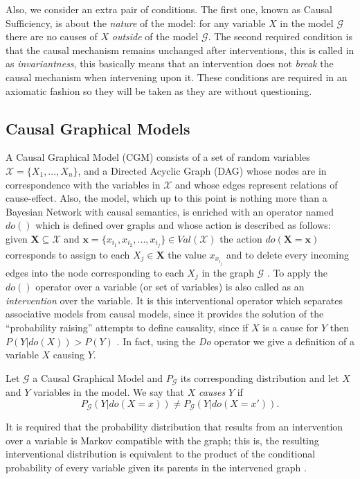 \documentclass{svjour3}                     %
\begin{document}
Also, we consider an extra pair of conditions. The first one, known as Causal Sufficiency, is about the \textit{nature} of the model: for any variable $X$ in the model $\mathcal{G}$ there are no causes of $X$ \textit{outside} of the model $\mathcal{G}$\citep{spirtes2000causation,pearl2009causality,sucar2015probabilistic}. The second required condition is that the causal mechanism remains unchanged after interventions, this is called in \citep{woodward2005making} as \textit{invariantness}, this basically means that an intervention does not \textit{break} the causal mechanism when intervening upon it. These conditions are required in an axiomatic fashion so they will be taken as they are without questioning.

\subsection{Causal Graphical Models}
A Causal Graphical Model (CGM) \citep{koller2009probabilistic,sucar2015probabilistic} consists of a set of random variables $\mathcal{X}=\{ X_1,...,X_n \}$, and a Directed Acyclic Graph (DAG) whose nodes are in correspondence with the variables in $\mathcal{X}$ and whose edges represent relations of cause-effect. Also, the model, which up to this point is nothing more than a Bayesian Network with causal semantics, is enriched with an operator named $do()$ which is defined over graphs and whose action is described as follows: given $\mathbf{X} \subseteq \mathcal{X}$ and $\mathbf{x} = \{ x_{i_1}, x_{i_2}, ... , x_{i_j} \} \in Val(\mathcal{X})$ the action $do(\mathbf{X} = \mathbf{x} )$ corresponds to assign to each $X_j \in \mathbf{X}$ the value $x_{x_{i_j}}$ and to delete every incoming edges into the node corresponding to each $X_j$ in the graph $\mathcal{G}$ \citep{pearl2009causality,koller2009probabilistic,sucar2015probabilistic}. To apply the $do()$ operator over a variable (or set of variables) is also called as an \textit{intervention} over the variable. It is this interventional operator which separates associative models from causal models, since it provides the solution of the “probability raising” attempts to define causality, since if $X$ is a cause for $Y$ then $P(Y | do(X)) > P(Y)$ \citep{pearl2018why}. In fact, using the \textit{Do} operator we give a definition of a variable $X$ causing $Y$.
\begin{definition}
Let $\mathcal{G}$ a Causal Graphical Model and $P_\mathcal{G}$ its corresponding distribution and let $X$ and $Y$ variables in the model. We say that $X$ \textit{causes} $Y$ if 
\[ P_\mathcal{G}(Y | do(X=x)) \neq P_\mathcal{G}(Y | do(X=x')). \]
\end{definition}
It is required that the probability distribution that results from an intervention over a variable is Markov compatible with the graph; this is, the resulting interventional distribution is equivalent to the product of the conditional probability of every variable given its parents in the intervened graph \citep{sucar2015probabilistic}.
\end{document}
